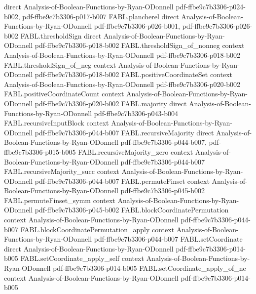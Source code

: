 \begin{theorem}
  {direct}
  {Analysis-of-Boolean-Functions-by-Ryan-ODonnell}
  {pdf-ffbe9c7b3306-p024-b002,
    pdf-ffbe9c7b3306-p017-b007}
\proofstep
  {FABL.plancherel}
  {direct}
  {Analysis-of-Boolean-Functions-by-Ryan-ODonnell}
  {pdf-ffbe9c7b3306-p026-b001,
    pdf-ffbe9c7b3306-p026-b002}
\proofstep
  {FABL.thresholdSign}
  {direct}
  {Analysis-of-Boolean-Functions-by-Ryan-ODonnell}
  {pdf-ffbe9c7b3306-p018-b002}
\proofstep
  {FABL.thresholdSign_of_nonneg}
  {context}
  {Analysis-of-Boolean-Functions-by-Ryan-ODonnell}
  {pdf-ffbe9c7b3306-p018-b002}
\proofstep
  {FABL.thresholdSign_of_neg}
  {context}
  {Analysis-of-Boolean-Functions-by-Ryan-ODonnell}
  {pdf-ffbe9c7b3306-p018-b002}
\proofstep
  {FABL.positiveCoordinateSet}
  {context}
  {Analysis-of-Boolean-Functions-by-Ryan-ODonnell}
  {pdf-ffbe9c7b3306-p020-b002}
\proofstep
  {FABL.positiveCoordinateCount}
  {context}
  {Analysis-of-Boolean-Functions-by-Ryan-ODonnell}
  {pdf-ffbe9c7b3306-p020-b002}
\proofstep
  {FABL.majority}
  {direct}
  {Analysis-of-Boolean-Functions-by-Ryan-ODonnell}
  {pdf-ffbe9c7b3306-p043-b004}
\proofstep
  {FABL.recursiveInputBlock}
  {context}
  {Analysis-of-Boolean-Functions-by-Ryan-ODonnell}
  {pdf-ffbe9c7b3306-p044-b007}
\proofstep
  {FABL.recursiveMajority}
  {direct}
  {Analysis-of-Boolean-Functions-by-Ryan-ODonnell}
  {pdf-ffbe9c7b3306-p044-b007,
    pdf-ffbe9c7b3306-p015-b005}
\proofstep
  {FABL.recursiveMajority_zero}
  {context}
  {Analysis-of-Boolean-Functions-by-Ryan-ODonnell}
  {pdf-ffbe9c7b3306-p044-b007}
\proofstep
  {FABL.recursiveMajority_succ}
  {context}
  {Analysis-of-Boolean-Functions-by-Ryan-ODonnell}
  {pdf-ffbe9c7b3306-p044-b007}
\proofstep
  {FABL.permuteFinset}
  {context}
  {Analysis-of-Boolean-Functions-by-Ryan-ODonnell}
  {pdf-ffbe9c7b3306-p045-b002}
\proofstep
  {FABL.permuteFinset_symm}
  {context}
  {Analysis-of-Boolean-Functions-by-Ryan-ODonnell}
  {pdf-ffbe9c7b3306-p045-b002}
\proofstep
  {FABL.blockCoordinatePermutation}
  {context}
  {Analysis-of-Boolean-Functions-by-Ryan-ODonnell}
  {pdf-ffbe9c7b3306-p044-b007}
\proofstep
  {FABL.blockCoordinatePermutation_apply}
  {context}
  {Analysis-of-Boolean-Functions-by-Ryan-ODonnell}
  {pdf-ffbe9c7b3306-p044-b007}
\proofstep
  {FABL.setCoordinate}
  {direct}
  {Analysis-of-Boolean-Functions-by-Ryan-ODonnell}
  {pdf-ffbe9c7b3306-p014-b005}
\proofstep
  {FABL.setCoordinate_apply_self}
  {context}
  {Analysis-of-Boolean-Functions-by-Ryan-ODonnell}
  {pdf-ffbe9c7b3306-p014-b005}
\proofstep
  {FABL.setCoordinate_apply_of_ne}
  {context}
  {Analysis-of-Boolean-Functions-by-Ryan-ODonnell}
  {pdf-ffbe9c7b3306-p014-b005}

\end{theorem}
